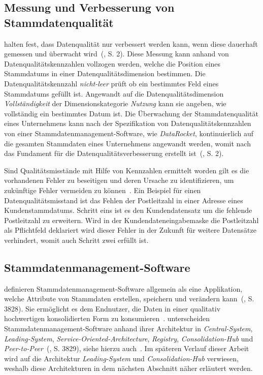 \documentclass[
  language=german, %
  type=bachelor%
]{isthesis}
\begin{document}
\begin{content}
	\subsection{Messung und Verbesserung von Stammdatenqualität}
	\textsc{\citeauthor{baghi2013controlling}} halten fest, dass Datenqualität
	nur verbessert werden kann, wenn diese dauerhaft gemessen und überwacht
	wird~(\citeyear{baghi2013controlling}, S. 2). Diese Messung kann anhand von
	Datenqualitätskennzahlen vollzogen werden, welche die Position eines
	Stammdatums in einer Datenqualitätsdimension bestimmen. Die
	Datenqualitätskennzahl \textit{nicht-leer} prüft \zB{} ob ein bestimmtes Feld
	eines Stammdatums gefüllt ist. Angewandt auf die Datenqualitätsdimension
	\textit{Vollständigkeit} der Dimensionskategorie \textit{Nutzung} kann sie
	angeben, wie vollständig ein bestimmtes Datum ist. Die Überwachung der
	Stammdatenqualität eines Unternehmens kann nach der Spezifikation von
	Datenqualitätskennzahlen von einer Stammdatenmanagement-Software, wie \zB{}
	\textit{DataRocket}, kontinuierlich auf die gesamten Stammdaten eines
	Unternehmens angewandt werden, womit nach
	\textsc{\citeauthor{baghi2013controlling}} das Fundament für die
	Datenqualitätsverbesserung erstellt ist~(\citeyear{baghi2013controlling}, S.
	2).

	Sind Qualitätsmisstände mit Hilfe von Kennzahlen ermittelt worden gilt es die
	vorhandenen Fehler zu beseitigen und deren Ursache zu identifizieren, um
	zukünftige Fehler vermeiden zu können~\cite[][S. 22]{eckerson2002data}. Ein
	Beispiel für einen Datenqualitätsmisstand ist das Fehlen der Postleitzahl in
	einer Adresse eines Kundenstammdatums. Schritt eins ist es den
	Kundendatensatz um die fehlende Postleitzahl zu erweitern. Wird in der
	Kundendateneingabemaske die Postleitzahl als Pflichtfeld deklariert wird
	dieser Fehler in der Zukunft für weitere Datensätze verhindert, womit auch
	Schritt zwei erfüllt ist.

	\subsection{Stammdatenmanagement-Software}
	\textsc{\citeauthor{baghi2014toward}} definieren
	Stammdatenmanagement-Software allgemein als eine Applikation, welche
  Attribute von Stammdaten erstellen, speichern und verändern kann~(\citeyear{baghi2014toward}, S. 3828).  Sie
	ermöglicht es dem Endnutzer, die Daten in einer qualitativ hochwertigen
	konsolidierten Form zu konsumieren~\cite[][Abschnitt
	1.2.]{dreibelbis2008enterprise}.  \textsc{\citeauthor{baghi2014toward}}
	unterscheiden Stammdatenmanagement-Software anhand ihrer Architektur in
	\textit{Central-System}, \textit{Leading-System},
	\textit{Service-Oriented-Architecture}, \textit{Registry},
  \textit{Consolidation-Hub} und \textit{Peer-to-Peer}~(\citeyear{baghi2014toward}, S. 3829), siehe hierzu auch~\cite[][Abschnitt
	5.3.1.]{dreibelbis2008enterprise}. Im späteren Verlauf dieser Arbeit wird auf
	die Architektur \textit{Leading-System} und \textit{Consolidation-Hub}
	verwiesen, weshalb diese Architekturen in dem nächsten Abschnitt näher
	erläutert werden.


\end{content}
\end{document}

